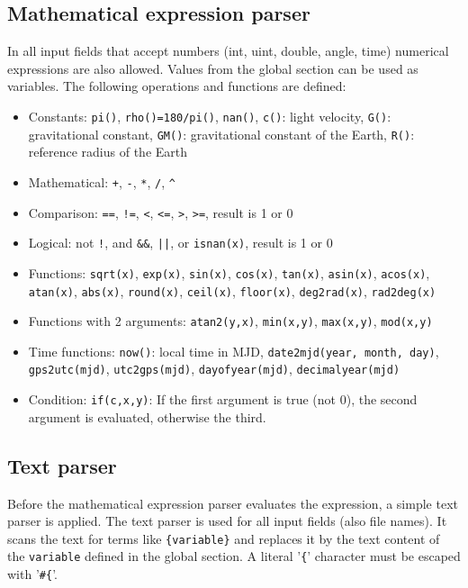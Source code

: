 
\subsection{Mathematical expression parser}\label{general.parser:expression}
In all input fields that accept numbers (int, uint, double, angle, time) numerical
expressions are also allowed. Values from the global section can be used as variables. The following
operations and functions are defined:
\begin{itemize}
\item Constants:    \verb|pi()|, \verb|rho()=180/pi()|, \verb|nan()|, \verb|c()|: light velocity,
                    \verb|G()|: gravitational constant, \verb|GM()|: gravitational constant of the Earth, \verb|R()|: reference radius of the Earth
\item Mathematical: \verb|+|, \verb|-|, \verb|*|, \verb|/|, \verb|^|
\item Comparison:   \verb|==|, \verb|!=|, \verb|<|, \verb|<=|, \verb|>|, \verb|>=|, result is 1 or 0
\item Logical:      not \verb|!|, and \verb|&&|, \verb'||', or \verb|isnan(x)|, result is 1 or 0
\item Functions:    \verb|sqrt(x)|, \verb|exp(x)|,
                    \verb|sin(x)|,  \verb|cos(x)|, \verb|tan(x)|,
                    \verb|asin(x)|,  \verb|acos(x)|,  \verb|atan(x)|,
                    \verb|abs(x)|,  \verb|round(x)|,  \verb|ceil(x)|,  \verb|floor(x)|,
                    \verb|deg2rad(x)|, \verb|rad2deg(x)|
\item Functions with 2 arguments: \verb|atan2(y,x)|, \verb|min(x,y)|, \verb|max(x,y)|, \verb|mod(x,y)|
\item Time functions: \verb|now()|: local time in MJD, \verb|date2mjd(year, month, day)|, \verb|gps2utc(mjd)|, \verb|utc2gps(mjd)|, \verb|dayofyear(mjd)|, \verb|decimalyear(mjd)|
\item Condition: \verb|if(c,x,y)|: If the first argument is true (not 0), the second argument is evaluated, otherwise the third.
\end{itemize}


\subsection{Text parser}\label{general.parser:text}
Before the mathematical expression parser evaluates the expression, a simple text parser is applied.
The text parser is used for all input fields (also file names). It scans the text for terms like
\verb|{variable}| and replaces it by the text content of the \verb|variable| defined in the global section.
A literal '\verb|{|' character must be escaped with '\verb|#{|'.


